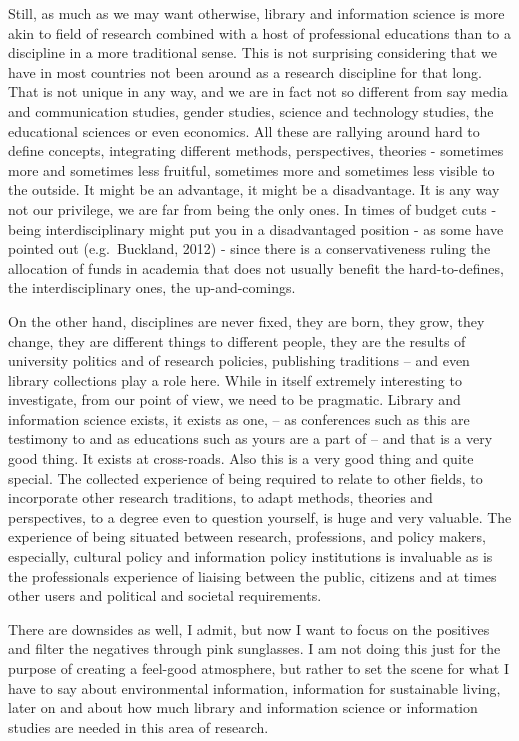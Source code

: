 \documentclass[a4paper,
fontsize=11pt,
oneside,
numbers=noperiodatend,
parskip=half-,
bibliography=totoc,
final
]{scrartcl}
\begin{document}
Still, as much as we may want otherwise, library and information science
is more akin to field of research combined with a host of professional
educations than to a discipline in a more traditional sense. This is not
surprising considering that we have in most countries not been around as
a research discipline for that long. That is not unique in any way, and
we are in fact not so different from say media and communication
studies, gender studies, science and technology studies, the educational
sciences or even economics. All these are rallying around hard to define
concepts, integrating different methods, perspectives, theories -
sometimes more and sometimes less fruitful, sometimes more and sometimes
less visible to the outside. It might be an advantage, it might be a
disadvantage. It is any way not our privilege, we are far from being the
only ones. In times of budget cuts - being interdisciplinary might put
you in a disadvantaged position - as some have pointed out
(e.g.~Buckland, 2012) - since there is a conservativeness ruling the
allocation of funds in academia that does not usually benefit the
hard-to-defines, the interdisciplinary ones, the up-and-comings.

On the other hand, disciplines are never fixed, they are born, they
grow, they change, they are different things to different people, they
are the results of university politics and of research policies,
publishing traditions -- and even library collections play a role here.
While in itself extremely interesting to investigate, from our point of
view, we need to be pragmatic. Library and information science exists,
it exists as one, -- as conferences such as this are testimony to and as
educations such as yours are a part of -- and that is a very good thing.
It exists at cross-roads. Also this is a very good thing and quite
special. The collected experience of being required to relate to other
fields, to incorporate other research traditions, to adapt methods,
theories and perspectives, to a degree even to question yourself, is
huge and very valuable. The experience of being situated between
research, professions, and policy makers, especially, cultural policy
and information policy institutions is invaluable as is the
professionals experience of liaising between the public, citizens and at
times other users and political and societal requirements.

There are downsides as well, I admit, but now I want to focus on the
positives and filter the negatives through pink sunglasses. I am not
doing this just for the purpose of creating a feel-good atmosphere, but
rather to set the scene for what I have to say about environmental
information, information for sustainable living, later on and about how
much library and information science or information studies are needed
in this area of research.
\end{document}
